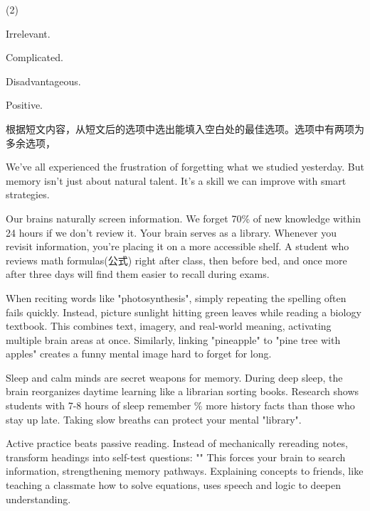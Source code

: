 \documentclass{英语试卷}
\begin{document}
\begin{choices}(2)
  \item Irrelevant.
  \item Complicated.
  \item Disadvantageous.
  \item Positive.
\end{choices}
\par 根据短文内容，从短文后的选项中选出能填入空白处的最佳选项。选项中有两项为多余选项，\par
\par We've all experienced the frustration of forgetting what we studied yesterday. But memory isn't just about natural talent. It's a skill we can improve with smart strategies.\par
\par Our brains naturally screen information. We forget 70\% of new knowledge within 24 hours if we don't review it. Your brain serves as a library. Whenever you revisit information, you're placing it on a more accessible shelf. A student who reviews math formulas(公式) right after class, then before bed, and once more after three days will find them easier to recall during exams. \par
\par {} When reciting words like "photosynthesis", simply repeating the spelling often fails quickly. Instead, picture sunlight hitting green leaves while reading a biology textbook. This combines text, imagery, and real-world meaning, activating multiple brain areas at once. Similarly, linking "pineapple" to "pine tree with apples" creates a funny mental image hard to forget for long.\par
\par Sleep and calm minds are secret weapons for memory. During deep sleep, the brain reorganizes daytime learning like a librarian sorting books. Research shows students with 7-8 hours of sleep remember \% more history facts than those who stay up late.  Taking slow breaths can protect your mental "library".\par
\par Active practice beats passive reading. Instead of mechanically rereading notes, transform headings into self-test questions: "" This forces your brain to search information, strengthening memory pathways. Explaining concepts to friends, like teaching a classmate how to solve equations, uses speech and logic to deepen understanding.\par
\end{document}
